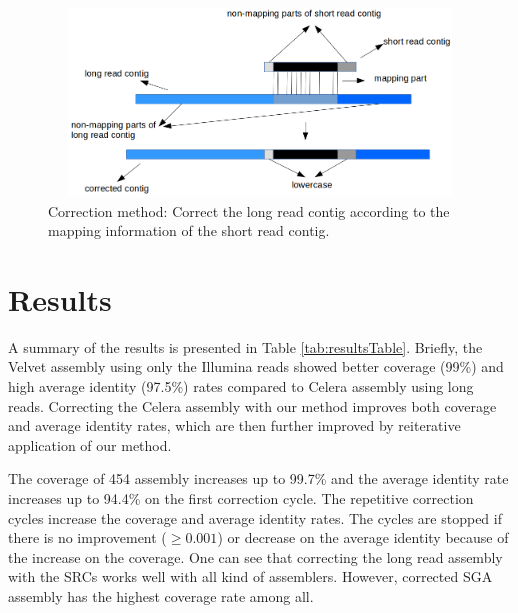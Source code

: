 \documentclass[12pt,a4paper]{cibb}
\begin{document}
\begin{figure}[htbp]
\centerline{\includegraphics[width=12cm, height=5cm]{BACAlgorithm1.png}}
\caption{Correction method: Correct the long read contig according to the mapping information of the short read contig.}
\label{correction}
\end{figure}


\section{\bf Results}
\label{res}
A summary of the results is presented in Table \ref{tab:resultsTable}. Briefly, the Velvet assembly using only the Illumina reads showed better coverage (99\%) and high average identity  (97.5\%) rates compared to Celera assembly using long reads. Correcting the Celera assembly with our method improves both coverage and average identity rates, which are then further improved by reiterative application of our method. 

The coverage of 454 assembly increases up to 99.7\% and the average identity rate increases up to 94.4\% on the first correction cycle. The repetitive correction cycles increase the coverage and average identity rates. The cycles are stopped if there is no improvement ($\geq 0.001$) or decrease on the average identity because of the increase on the coverage. One can see that correcting the long read assembly with the SRCs works well with all kind of assemblers. However, corrected SGA assembly has the highest coverage rate among all.
\end{document}
